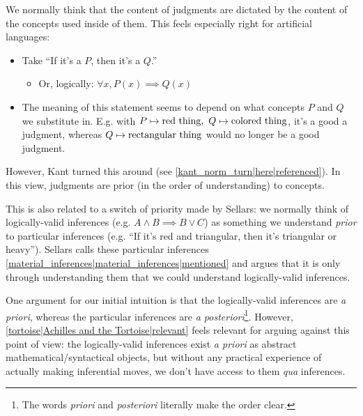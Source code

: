 We normally think that the content of judgments are dictated by the content of the concepts used inside of them. This feels especially right for artificial languages:

\begin{itemize}
\item Take ``If it's a $P$, then it's a $Q$.'' \begin{itemize}
\item Or, logically: $\forall x, P(x)\implies Q(x)$
\end{itemize}
\item The meaning of this statement seems to depend on what concepts $P$ and $Q$ we substitute in. E.g. with $P \mapsto {\rm red\ thing},\  Q \mapsto {\rm colored\ thing}$, it's a good a judgment, whereas $Q \mapsto {\rm rectangular\ thing}$ would no longer be a good judgment.
\end{itemize}

However, Kant turned this around (see \ref{kant_norm_turn|here|referenced}). In this view, judgments are prior (in the order of understanding) to concepts.

This is also related to a switch of priority made by Sellars: we normally think of logically-valid inferences (e.g. $A \land B \implies B \lor C$) as something we understand \emph{prior} to particular inferences (e.g. ``If it's red and triangular, then it's triangular or heavy''). Sellars calls these particular inferences \ref{material_inferences|material_inferences|mentioned} and argues that it is only through understanding them that we could understand logically-valid inferences.

One argument for our initial intuition is that the logically-valid inferences are \emph{a priori}, whereas the particular inferences are \emph{a posteriori}\footnote{The words \emph{priori} and \emph{posteriori} literally make the order clear.}. However, \ref{tortoise|Achilles and the Tortoise|relevant} feels relevant for arguing against this point of view: the logically-valid inferences exist \emph{a priori} as abstract mathematical/syntactical objects, but without any practical experience of actually making inferential moves, we don't have access to them \emph{qua} inferences.